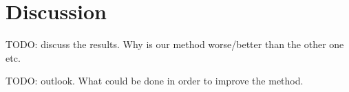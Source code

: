 
\section{Discussion}
\label{sec:discussion}
\label{sec:cil}

TODO: discuss the results. Why is our method worse/better than the other one etc.

TODO: outlook. What could be done in order to improve the method.

